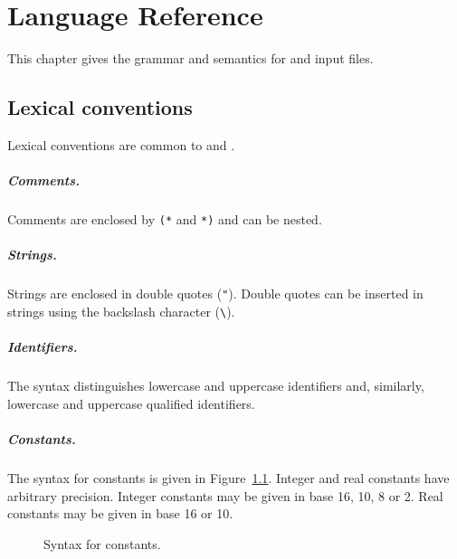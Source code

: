 \chapter{Language Reference}
\label{chap:syntaxref}

This chapter gives the grammar and semantics for \why and \whyml input files.

\section{Lexical conventions}

Lexical conventions are common to \why and \whyml.


\paragraph{Comments.}
Comments are enclosed by \texttt{(*} and \texttt{*)} and can be nested.

\paragraph{Strings.}
Strings are enclosed in double quotes (\verb!"!). Double quotes can be
inserted in strings using the backslash character (\verb!\!).


\paragraph{Identifiers.} The syntax distinguishes lowercase and
uppercase identifiers and, similarly, lowercase and uppercase
qualified identifiers.

\begin{center}\framebox{}\end{center}

\paragraph{Constants.}
The syntax for constants is given in Figure~\ref{fig:bnf:constant}.
Integer and real constants have arbitrary precision.
Integer constants may be given in base 16, 10, 8 or 2.
Real constants may be given in base 16 or 10.

\begin{figure}
\begin{center}\framebox{}\end{center}
  \caption{Syntax for constants.}
\label{fig:bnf:constant}
\end{figure}

